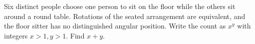 Six distinct people choose one person to sit on the floor while the others sit around a round table. Rotations of the seated arrangement are equivalent, and the floor sitter has no distinguished angular position. Write the count as $ x^y $ with integers $ x>1,y>1 $. Find $ x+y $.
